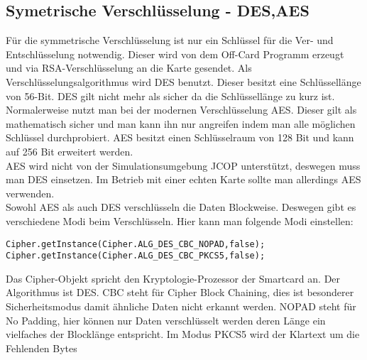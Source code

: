 \documentclass[parskip]{scrartcl}
\begin{document}
\subsection{Symetrische Verschlüsselung - DES,AES}
Für die symmetrische Verschlüsselung ist nur ein Schlüssel für die Ver- und Entschlüsselung notwendig. Dieser wird von dem Off-Card Programm erzeugt und via RSA-Verschlüsselung an die Karte gesendet. Als Verschlüsselungsalgorithmus wird DES benutzt. Dieser besitzt eine Schlüssellänge von 56-Bit. DES gilt nicht mehr als sicher da die Schlüssellänge zu kurz ist. Normalerweise nutzt man bei der modernen Verschlüsselung AES. Dieser gilt als mathematisch sicher und man kann ihn nur angreifen indem man alle möglichen Schlüssel durchprobiert. AES besitzt einen Schlüsselraum von 128 Bit und kann auf 256 Bit erweitert werden.\\ 
AES wird nicht von der Simulationsumgebung JCOP unterstützt, deswegen muss man DES einsetzen. Im Betrieb mit einer echten Karte sollte man allerdings AES verwenden.\\
Sowohl AES als auch DES verschlüsseln die Daten Blockweise. Deswegen gibt es verschiedene Modi beim Verschlüsseln. Hier kann man folgende Modi einstellen:
\begin{lstlisting}
Cipher.getInstance(Cipher.ALG_DES_CBC_NOPAD,false);
Cipher.getInstance(Cipher.ALG_DES_CBC_PKCS5,false);
\end{lstlisting}
Das Cipher-Objekt spricht den Kryptologie-Prozessor der Smartcard an. Der Algorithmus ist DES. CBC steht für Cipher Block Chaining, dies ist besonderer Sicherheitsmodus damit ähnliche Daten nicht erkannt werden. NOPAD steht für No Padding, hier können nur Daten verschlüsselt werden deren Länge ein vielfaches der Blocklänge entspricht. Im Modus PKCS5 wird der Klartext um die Fehlenden Bytes 
\end{document}
